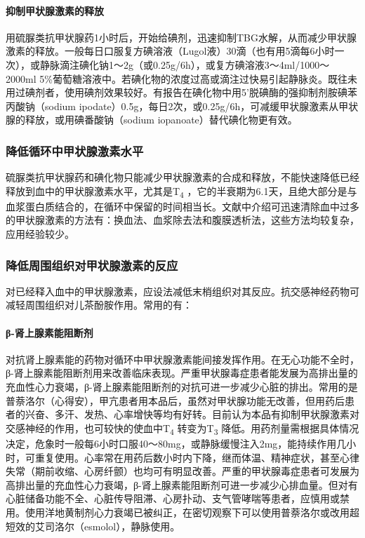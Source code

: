 \paragraph{抑制甲状腺激素的释放}

用硫脲类抗甲状腺药1小时后，开始给碘剂，迅速抑制TBG水解，从而减少甲状腺激素的释放。一般每日口服复方碘溶液（Lugol液）30滴（也有用5滴每6小时一次），或静脉滴注碘化钠1～2g（或0.25g/6h），或复方碘溶液3～4ml/1000～2000ml
5\%葡萄糖溶液中。若碘化物的浓度过高或滴注过快易引起静脉炎。既往未用过碘剂者，使用碘剂效果较好。有报告在碘化物中用5'脱碘酶的强抑制剂胺碘苯丙酸钠（sodium
ipodate）0.5g，每日2次，或0.25g/6h，可减缓甲状腺激素从甲状腺的释放，或用碘番酸钠（sodium
iopanoate）替代碘化物更有效。

\subsubsection{降低循环中甲状腺激素水平}

硫脲类抗甲状腺药和碘化物只能减少甲状腺激素的合成和释放，不能快速降低已经释放到血中的甲状腺激素水平，尤其是T\textsubscript{4}
，它的半衰期为6.1天，且绝大部分是与血浆蛋白质结合的，在循环中保留的时间相当长。文献中介绍可迅速清除血中过多的甲状腺激素的方法有：换血法、血浆除去法和腹膜透析法，这些方法均较复杂，应用经验较少。

\subsubsection{降低周围组织对甲状腺激素的反应}

对已经释入血中的甲状腺激素，应设法减低末梢组织对其反应。抗交感神经药物可减轻周围组织对儿茶酚胺作用。常用的有：

\paragraph{β-肾上腺素能阻断剂}

对抗肾上腺素能的药物对循环中甲状腺激素能间接发挥作用。在无心功能不全时，β-肾上腺素能阻断剂用来改善临床表现。严重甲状腺毒症患者能发展为高排出量的充血性心力衰竭，β-肾上腺素能阻断剂的对抗可进一步减少心脏的排出。常用的是普萘洛尔（心得安），甲亢患者用本品后，虽然对甲状腺功能无改善，但用药后患者的兴奋、多汗、发热、心率增快等均有好转。目前认为本品有抑制甲状腺激素对交感神经的作用，也可较快的使血中T\textsubscript{4}
转变为T\textsubscript{3}
降低。用药剂量需根据具体情况决定，危象时一般每6小时口服40～80mg，或静脉缓慢注入2mg，能持续作用几小时，可重复使用。心率常在用药后数小时内下降，继而体温、精神症状，甚至心律失常（期前收缩、心房纤颤）也均可有明显改善。严重的甲状腺毒症患者可发展为高排出量的充血性心力衰竭，β-肾上腺素能阻断剂可进一步减少心排血量。但对有心脏储备功能不全、心脏传导阻滞、心房扑动、支气管哮喘等患者，应慎用或禁用。使用洋地黄制剂心力衰竭已被纠正，在密切观察下可以使用普萘洛尔或改用超短效的艾司洛尔（esmolol），静脉使用。

